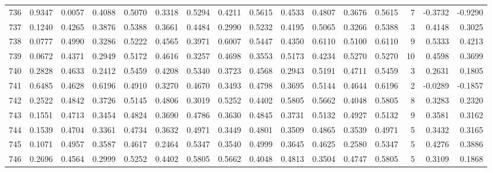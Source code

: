 \begin{tabular}{lrrrrrrrrrrrrrrr}
736 &      0.9347 &  0.0057 &  0.4088 &  0.5070 &  0.3318 &  0.5294 &  0.4211 &  0.5615 &  0.4533 &  0.4807 &   0.3676 &     0.5615 &      7 &                   -0.3732 &                    -0.9290 \\
737 &      0.1240 &  0.4265 &  0.3876 &  0.5388 &  0.3661 &  0.4484 &  0.2990 &  0.5232 &  0.4195 &  0.5065 &   0.3266 &     0.5388 &      3 &                    0.4148 &                     0.3025 \\
738 &      0.0777 &  0.4990 &  0.3286 &  0.5222 &  0.4565 &  0.3971 &  0.6007 &  0.5447 &  0.4350 &  0.6110 &   0.5100 &     0.6110 &      9 &                    0.5333 &                     0.4213 \\
739 &      0.0672 &  0.4371 &  0.2949 &  0.5172 &  0.4616 &  0.3257 &  0.4698 &  0.3553 &  0.5173 &  0.4234 &   0.5270 &     0.5270 &     10 &                    0.4598 &                     0.3699 \\
740 &      0.2828 &  0.4633 &  0.2412 &  0.5459 &  0.4208 &  0.5340 &  0.3723 &  0.4568 &  0.2943 &  0.5191 &   0.4711 &     0.5459 &      3 &                    0.2631 &                     0.1805 \\
741 &      0.6485 &  0.4628 &  0.6196 &  0.4910 &  0.3270 &  0.4670 &  0.3493 &  0.4798 &  0.3695 &  0.5144 &   0.4644 &     0.6196 &      2 &                   -0.0289 &                    -0.1857 \\
742 &      0.2522 &  0.4842 &  0.3726 &  0.5145 &  0.4806 &  0.3019 &  0.5252 &  0.4402 &  0.5805 &  0.5662 &   0.4048 &     0.5805 &      8 &                    0.3283 &                     0.2320 \\
743 &      0.1551 &  0.4713 &  0.3454 &  0.4824 &  0.3690 &  0.4786 &  0.3630 &  0.4845 &  0.3731 &  0.5132 &   0.4927 &     0.5132 &      9 &                    0.3581 &                     0.3162 \\
744 &      0.1539 &  0.4704 &  0.3361 &  0.4734 &  0.3632 &  0.4971 &  0.3449 &  0.4801 &  0.3509 &  0.4865 &   0.3539 &     0.4971 &      5 &                    0.3432 &                     0.3165 \\
745 &      0.1071 &  0.4957 &  0.3587 &  0.4617 &  0.2464 &  0.5347 &  0.3540 &  0.4999 &  0.3645 &  0.4625 &   0.2580 &     0.5347 &      5 &                    0.4276 &                     0.3886 \\
746 &      0.2696 &  0.4564 &  0.2999 &  0.5252 &  0.4402 &  0.5805 &  0.5662 &  0.4048 &  0.4813 &  0.3504 &   0.4747 &     0.5805 &      5 &                    0.3109 &                     0.1868 \\

\end{tabular}
